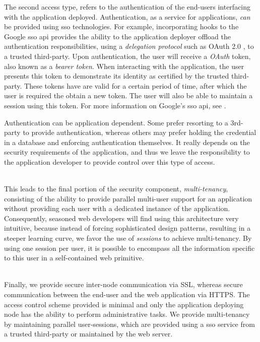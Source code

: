 \documentclass[12pt, titlepage]{uo_temp}
\begin{document}
     The second access type, refers to the authentication of the end-users interfacing
     with the application deployed. Authentication, as a service for applications,
     \emph{can} be provided using \gls{sso} technologies. For example, incorporating hooks
     to the Google \gls{sso} \gls{api} provides the ability to the application deployer
     offload the authentication responsibilities, using a \emph{delegation protocol} such
     as OAuth 2.0 \cite{jones2012oauth}, to a trusted third-party. Upon authentication,
     the user will receive a \emph{OAuth} token, also known as a \emph{bearer token}. When
     interacting with the application, the user presents this token to demonstrate its
     identity as certified by the trusted third-party. These tokens have are valid for a
     certain period of time, after which the user is required the obtain a new token. The
     user will also be able to maintain a session using this token. For more information
     on Google's \gls{sso} \gls{api}, see \cite{google_sso}.

     Authentication can be application dependent. Some prefer resorting to a 3rd-party to
     provide authentication, whereas others may prefer holding the credential in a
     database and enforcing authentication themselves. It really depends on the security
     requirements of the application, and thus we leave the responsibility to the
     application developer to provide control over this type of access.

     \\ This leads to the final portion of the security component, \emph{multi-tenancy},
     consisting of the ability to provide parallel multi-user support for an application
     without providing each user with a dedicated instance of the application.
     Consequently, seasoned web developers will find using this architecture very
     intuitive, because instead of forcing sophisticated design patterns, resulting in a
     steeper learning curve, we favor the use of \emph{sessions} to achieve
     multi-tenancy. By using one session per user, it is possible to encompass all the
     information specific to this user in a self-contained web primitive.

     \\
     Finally, we provide secure inter-node communication via SSL, whereas secure
     communication between the end-user and the web application via HTTPS. The access
     control scheme provided is minimal and only the application deploying node has the
     ability to perform administrative tasks. We provide multi-tenancy by maintaining
     parallel user-sessions, which are provided using a \gls{sso} service from a trusted
     third-party or maintained by the web server.
\end{document}
